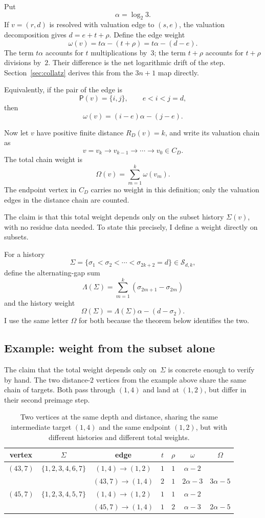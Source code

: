 \documentclass[11pt]{amsart}
\theoremstyle{definition}
\theoremstyle{remark}
\newcommand{\Pair}{\mathsf P}
\newcommand{\Sfam}{\mathcal S}
\begin{document}
Put
\[
\alpha=\log_2 3.
\]
If $v=(r,d)$ is resolved with valuation edge to $(s,e)$, the valuation decomposition gives $d=e+t+\rho$.  Define the edge weight
\[
\omega(v)=t\alpha-(t+\rho)=t\alpha-(d-e).
\]
The term $t\alpha$ accounts for $t$ multiplications by~$3$; the term $t+\rho$ accounts for $t+\rho$ divisions by~$2$.  Their difference is the net logarithmic drift of the step.  Section~\ref{sec:collatz} derives this from the $3n+1$ map directly.

Equivalently, if the pair of the edge is
\[
\Pair(v)=\{i,j\},\qquad e<i<j=d,
\]
then
\[
\omega(v)=(i-e)\alpha-(j-e).
\]

Now let $v$ have positive finite distance $R_D(v)=k$, and write its valuation chain as
\[
v=v_k\to v_{k-1}\to\cdots\to v_0\in C_D.
\]
The total chain weight is
\[
\Omega(v)=\sum_{m=1}^k \omega(v_m).
\]
The endpoint vertex in $C_D$ carries no weight in this definition; only the valuation edges in the distance chain are counted.

The claim is that this total weight depends only on the subset history $\Sigma(v)$, with no residue data needed.  To state this precisely, I define a weight directly on subsets.

For a history
\[
\Sigma=\{\sigma_1<\sigma_2<\cdots<\sigma_{2k+2}=d\}\in\Sfam_{d,k},
\]
define the alternating-gap sum
\[
\Lambda(\Sigma)=\sum_{m=1}^k(\sigma_{2m+1}-\sigma_{2m})
\]
and the history weight
\[
\Omega(\Sigma)=\Lambda(\Sigma)\alpha-(d-\sigma_2).
\]
I use the same letter $\Omega$ for both because the theorem below identifies the two.

\subsection{Example: weight from the subset alone}\label{subsec:weight-ex}

The claim that the total weight depends only on~$\Sigma$ is concrete enough to verify by hand.  The two distance-$2$ vertices from the example above share the same chain of targets. Both pass through $(1,4)$ and land at $(1,2)$, but differ in their second preimage step.

\begin{table}[htbp]
\centering
\small
\renewcommand{\arraystretch}{1.15}
\begin{tabular}{ccccccc}
\toprule
vertex & $\Sigma$ & edge & $t$ & $\rho$ & $\omega$ & $\Omega$\\
\midrule
$(43,7)$ & $\{1,2,3,4,6,7\}$
  & $(1,4)\to(1,2)$ & $1$ & $1$ & $\alpha-2$ & \\
  & & $(43,7)\to(1,4)$ & $2$ & $1$ & $2\alpha-3$ & $3\alpha-5$\\[4pt]
$(45,7)$ & $\{1,2,3,4,5,7\}$
  & $(1,4)\to(1,2)$ & $1$ & $1$ & $\alpha-2$ & \\
  & & $(45,7)\to(1,4)$ & $1$ & $2$ & $\alpha-3$ & $2\alpha-5$\\
\bottomrule
\end{tabular}
\smallskip
\caption{Two vertices at the same depth and distance, sharing the same intermediate target $(1,4)$ and the same endpoint $(1,2)$, but with different histories and different total weights.}
\label{tab:weight-ex}
\end{table}
\end{document}
